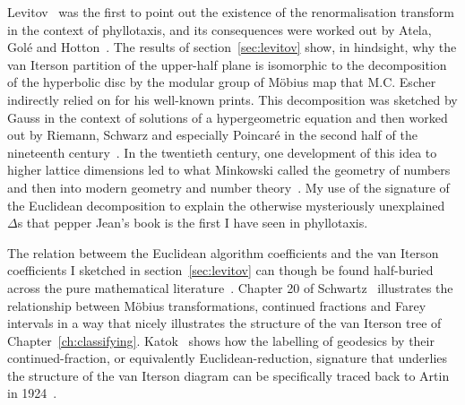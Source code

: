 Levitov~\cite{levitovFibonacciNumbersBotany1991} was the first to point out the existence of the renormalisation transform in the context of phyllotaxis, and its consequences were worked out by Atela, Golé and Hotton~\autocite{atelaDynamicalSystemPlant2002}. 
 The results of section~\ref{sec:levitov} show, in hindsight, why the van Iterson partition of the upper-half plane is isomorphic to the decomposition of the hyperbolic disc by the modular group of M{\"o}bius map that M.C. Escher indirectly relied on for his well-known prints. This decomposition was sketched by Gauss in the context of solutions of a hypergeometric equation and then worked out by Riemann,  Schwarz and especially Poincar\'{e} in the second half of the nineteenth century~\cite{gaussBemerkungFragmentenUber2011,poincarePapersFuchsianFunctions1985,schwarzUeberDiejenigenFalle1873,johnstillwellTranslatorNotePoincare1996}. 
  In the twentieth century, one development of this idea to higher lattice dimensions led to what Minkowski called the geometry of numbers and then into modern geometry and number theory~\cite{bergerGeometryRevealedJacob2010}.
My use of the signature of the Euclidean decomposition to explain the otherwise mysteriously unexplained $\Delta$s that pepper Jean's book is the first I have seen in phyllotaxis. 

The relation betweem the Euclidean algorithm coefficients and the van Iterson coefficients I sketched in section~\ref{sec:levitov} can though be found half-buried across the pure mathematical literature~\cite{conradIdealClassesSL22024}.   Chapter 20 of Schwartz~\cite{schwartzMostlySurfaces2011} illustrates the relationship between M\"obius transformations, continued fractions and Farey intervals in a way that nicely illustrates the structure of the van Iterson tree of Chapter~\ref{ch:classifying}. Katok~\cite{katokSymbolicDynamicsModular2007} shows how the labelling of geodesics by their continued-fraction, or equivalently Euclidean-reduction, signature  that underlies the structure of the van Iterson diagram can be specifically traced back to Artin in 1924~\cite{artinMechanischesSystemMit1924}. 
 

